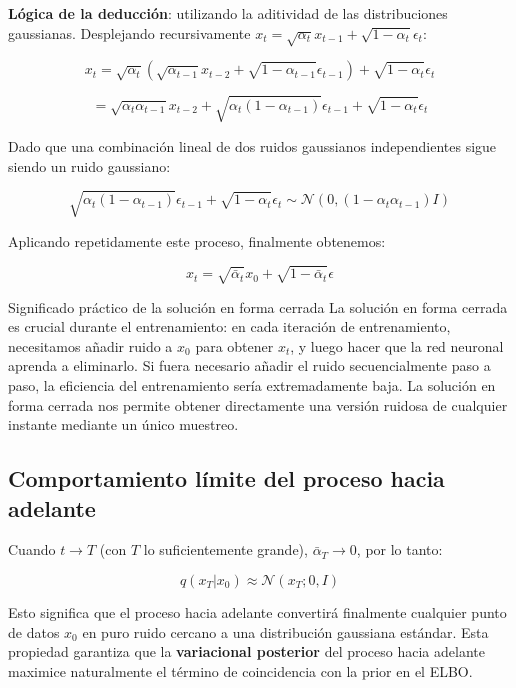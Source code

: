 \textbf{Lógica de la deducción}: utilizando la aditividad de las distribuciones gaussianas. Desplejando recursivamente $x_t = \sqrt{\alpha_t} x_{t-1} + \sqrt{1-\alpha_t} \epsilon_t$:

$$x_t = \sqrt{\alpha_t} (\sqrt{\alpha_{t-1}} x_{t-2} + \sqrt{1-\alpha_{t-1}} \epsilon_{t-1}) + \sqrt{1-\alpha_t} \epsilon_t$$

$$= \sqrt{\alpha_t \alpha_{t-1}} x_{t-2} + \sqrt{\alpha_t(1-\alpha_{t-1})} \epsilon_{t-1} + \sqrt{1-\alpha_t} \epsilon_t$$

Dado que una combinación lineal de dos ruidos gaussianos independientes sigue siendo un ruido gaussiano:

$$\sqrt{\alpha_t(1-\alpha_{t-1})} \epsilon_{t-1} + \sqrt{1-\alpha_t} \epsilon_t \sim \mathcal{N}(0, (1-\alpha_t\alpha_{t-1}) I)$$

Aplicando repetidamente este proceso, finalmente obtenemos:

$$x_t = \sqrt{\bar{\alpha}_t} x_0 + \sqrt{1-\bar{\alpha}_t} \epsilon$$

\begin{knowledgebox}{Significado práctico de la solución en forma cerrada}
La solución en forma cerrada es crucial durante el entrenamiento: en cada iteración de entrenamiento, necesitamos añadir ruido a $x_0$ para obtener $x_t$, y luego hacer que la red neuronal aprenda a eliminarlo. Si fuera necesario añadir el ruido secuencialmente paso a paso, la eficiencia del entrenamiento sería extremadamente baja. La solución en forma cerrada nos permite obtener directamente una versión ruidosa de cualquier instante mediante un único muestreo.
\end{knowledgebox}

\subsection{Comportamiento límite del proceso hacia adelante}

Cuando $t \to T$ (con $T$ lo suficientemente grande), $\bar{\alpha}_T \to 0$, por lo tanto:

$$q(x_T | x_0) \approx \mathcal{N}(x_T; 0, I)$$

Esto significa que el proceso hacia adelante convertirá finalmente cualquier punto de datos $x_0$ en puro ruido cercano a una distribución gaussiana estándar. Esta propiedad garantiza que la \textbf{variacional posterior} del proceso hacia adelante maximice naturalmente el término de coincidencia con la prior en el ELBO.


